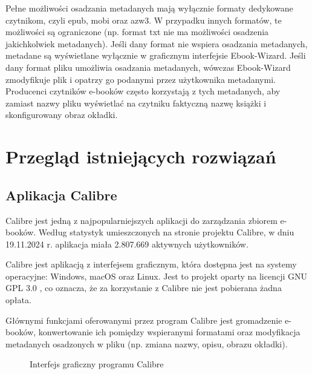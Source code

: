 Pełne możliwości osadzania metadanych mają wyłącznie formaty dedykowane czytnikom, czyli epub, mobi oraz azw3. \cite{format_comparision} W przypadku innych formatów, te możliwości są ograniczone (np. format txt nie ma możliwości osadzenia jakichkolwiek metadanych). Jeśli dany format nie wspiera osadzania metadanych, metadane są wyświetlane wyłącznie w graficznym interfejsie Ebook-Wizard. Jeśli dany format pliku umożliwia osadzania metadanych, wówczas Ebook-Wizard zmodyfikuje plik i opatrzy go podanymi przez użytkownika metadanymi. Producenci czytników e-booków często korzystają z tych metadanych, aby zamiast nazwy pliku wyświetlać na czytniku faktyczną nazwę książki i skonfigurowany obraz okładki.

\section{Przegląd istniejących rozwiązań}

\subsection{Aplikacja Calibre}
Calibre jest jedną z najpopularniejszych aplikacji do zarządzania zbiorem e-booków. Według statystyk umieszczonych na stronie projektu Calibre, w dniu 19.11.2024 r. aplikacja miała 2.807.669 aktywnych użytkowników. \cite{calibre_usage_statistics}

Calibre jest aplikacją z interfejsem graficznym, która dostępna jest na systemy operacyjne: Windows, macOS oraz Linux. Jest to projekt oparty na licencji GNU GPL 3.0 \cite{calibre_user_manual}, co oznacza, że za korzystanie z Calibre nie jest pobierana żadna opłata. \cite{gpl}

Głównymi funkcjami oferowanymi przez program Calibre jest gromadzenie e-booków, konwertowanie ich pomiędzy wspieranymi formatami oraz modyfikacja metadanych osadzonych w pliku (np. zmiana nazwy, opisu, obrazu okładki). \cite{calibre_user_manual}

\begin{figure}[h]
    \centering
    \setlength{\fboxsep}{0pt}
    \setlength{\fboxrule}{0.4pt}
    \caption{Interfejs graficzny programu Calibre}
    \label{fig:obrazek_z_ramką}
\end{figure}

